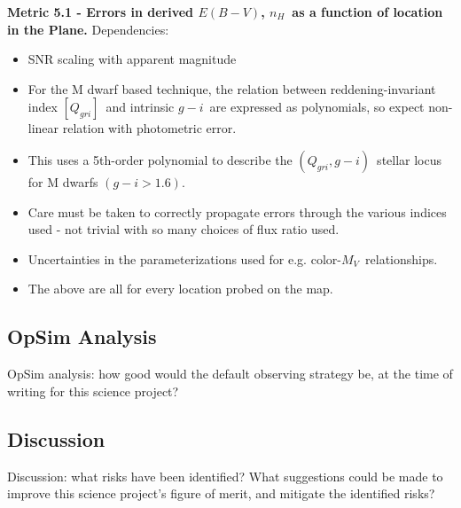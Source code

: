 {\bf Metric 5.1 - Errors in derived $E(B-V)$, $n_H$~as a function of
  location in the Plane.}
Dependencies:
\begin{itemize}
  \item SNR scaling with apparent magnitude
    \item For the M dwarf based technique, the relation between
      reddening-invariant index $[Q_{gri}]$~and intrinsic $g-i$~are
      expressed as polynomials, so expect non-linear relation with
      photometric error.  
      \item This uses a 5th-order polynomial to describe the
        $(Q_{gri}, g-i)$~stellar locus for M dwarfs $(g-i > 1.6)$.
        \item Care must be taken to correctly propagate errors through
          the various indices used - not trivial with so many choices
          of flux ratio used.
          \item Uncertainties in the parameterizations used for e.g. color-$M_V$~relationships.
            \item The above are all for every location probed on the map.
\end{itemize}


\subsection{OpSim Analysis}
\label{sec:keyword:MW_Disk_analysis}

OpSim analysis: how good would the default observing strategy be, at
the time of writing for this science project?



\subsection{Discussion}
\label{sec:keyword:MW_Disk_discussion}

Discussion: what risks have been identified? What suggestions could be
made to improve this science project's figure of merit, and mitigate
the identified risks?



\navigationbar
